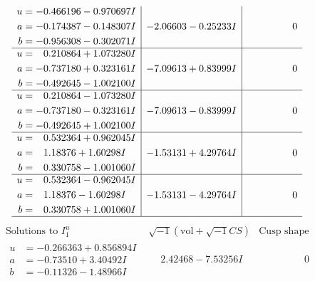 \documentclass[1p]{elsarticle_modified}
\theoremstyle{definition}
\newcommand{\I}{\sqrt{-1}}
\begin{document}
$$\begin{array}{c|c|c}
\begin{aligned}
u &= -0.466196 - 0.970697 I \\
a &= -0.174387 - 0.148307 I \\
b &= -0.956308 - 0.302071 I\end{aligned}
 & -2.06603 - 0.25233 I & \phantom{-0.000000 } 0 \\ \hline\begin{aligned}
u &= \phantom{-}0.210864 + 1.073280 I \\
a &= -0.737180 + 0.323161 I \\
b &= -0.492645 - 1.002100 I\end{aligned}
 & -7.09613 + 0.83999 I & \phantom{-0.000000 } 0 \\ \hline\begin{aligned}
u &= \phantom{-}0.210864 - 1.073280 I \\
a &= -0.737180 - 0.323161 I \\
b &= -0.492645 + 1.002100 I\end{aligned}
 & -7.09613 - 0.83999 I & \phantom{-0.000000 } 0 \\ \hline\begin{aligned}
u &= \phantom{-}0.532364 + 0.962045 I \\
a &= \phantom{-}1.18376 + 1.60298 I \\
b &= \phantom{-}0.330758 - 1.001060 I\end{aligned}
 & -1.53131 + 4.29764 I & \phantom{-0.000000 } 0 \\ \hline\begin{aligned}
u &= \phantom{-}0.532364 - 0.962045 I \\
a &= \phantom{-}1.18376 - 1.60298 I \\
b &= \phantom{-}0.330758 + 1.001060 I\end{aligned}
 & -1.53131 - 4.29764 I & \phantom{-0.000000 } 0\\
 \hline 
 \end{array}$$\newpage$$\begin{array}{c|c|c}  
\text{Solutions to }I^u_{1}& \I (\text{vol} + \sqrt{-1}CS) & \text{Cusp shape}\\
 \hline 
\begin{aligned}
u &= -0.266363 + 0.856894 I \\
a &= -0.73510 + 3.40492 I \\
b &= -0.11326 - 1.48966 I\end{aligned}
 & \phantom{-}2.42468 - 7.53256 I & \phantom{-0.000000 } 0 \\ \hline\begin{aligned}

\end{aligned}
\end{array}$$
\end{document}
